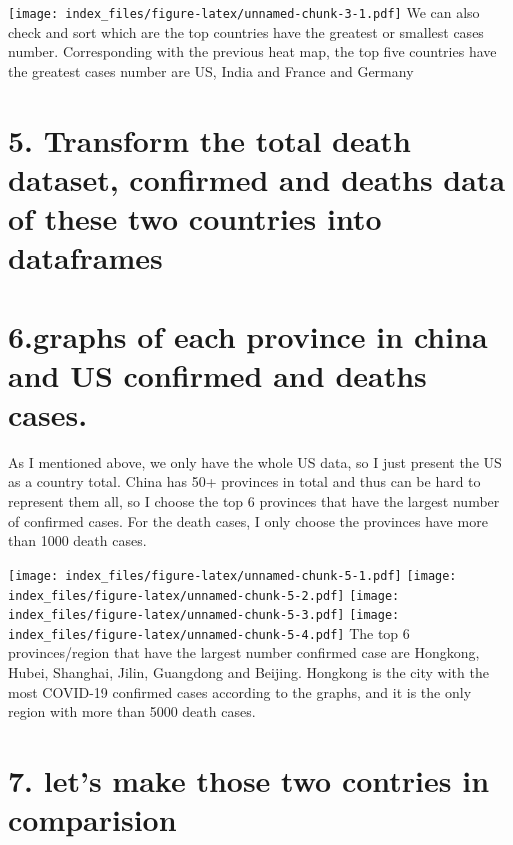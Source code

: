 \documentclass[
]{article}
\begin{document}
\texttt{[image: index\_files/figure-latex/unnamed-chunk-3-1.pdf]} We can
also check and sort which are the top countries have the greatest or
smallest cases number. Corresponding with the previous heat map, the top
five countries have the greatest cases number are US, India and France
and Germany

\hypertarget{transform-the-total-death-dataset-confirmed-and-deaths-data-of-these-two-countries-into-dataframes}{%
\section{5. Transform the total death dataset, confirmed and deaths data
of these two countries into
dataframes}\label{transform-the-total-death-dataset-confirmed-and-deaths-data-of-these-two-countries-into-dataframes}}

\hypertarget{graphs-of-each-province-in-china-and-us-confirmed-and-deaths-cases.}{%
\section{6.graphs of each province in china and US confirmed and deaths
cases.}\label{graphs-of-each-province-in-china-and-us-confirmed-and-deaths-cases.}}

As I mentioned above, we only have the whole US data, so I just present
the US as a country total. China has 50+ provinces in total and thus can
be hard to represent them all, so I choose the top 6 provinces that have
the largest number of confirmed cases. For the death cases, I only
choose the provinces have more than 1000 death cases.

\texttt{[image: index\_files/figure-latex/unnamed-chunk-5-1.pdf]}
\texttt{[image: index\_files/figure-latex/unnamed-chunk-5-2.pdf]}
\texttt{[image: index\_files/figure-latex/unnamed-chunk-5-3.pdf]}
\texttt{[image: index\_files/figure-latex/unnamed-chunk-5-4.pdf]} The top
6 provinces/region that have the largest number confirmed case are
Hongkong, Hubei, Shanghai, Jilin, Guangdong and Beijing. Hongkong is the
city with the most COVID-19 confirmed cases according to the graphs, and
it is the only region with more than 5000 death cases.

\hypertarget{lets-make-those-two-contries-in-comparision}{%
\section{7. let's make those two contries in
comparision}\label{lets-make-those-two-contries-in-comparision}}
\end{document}
